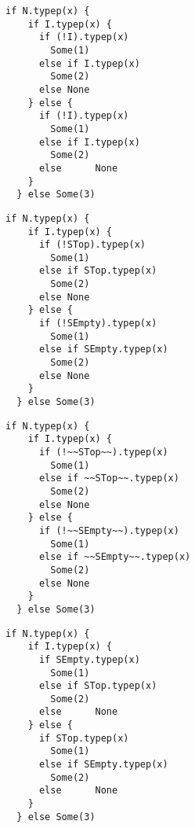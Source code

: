 \newsavebox\typecaseGbox
\begin{lrbox}{\typecaseGbox}
  \begin{minipage}{8cm}
\begin{lstlisting}[style=scalaioScala]
  if N.typep(x) {
    if I.typep(x) {
      if (!I).typep(x)
        Some(1)
      else if I.typep(x)
        Some(2)
      else None
    } else {
      if (!I).typep(x)
        Some(1)
      else if I.typep(x)
        Some(2)
      else      None
    }
  } else Some(3)
\end{lstlisting}
  \end{minipage}
\end{lrbox}


\newsavebox\typecaseHbox
\begin{lrbox}{\typecaseHbox}
  \begin{minipage}{8cm}
\begin{lstlisting}[style=scalaioScala]
  if N.typep(x) {
    if I.typep(x) {
      if (!STop).typep(x)
        Some(1)
      else if STop.typep(x)
        Some(2)
      else None
    } else {
      if (!SEmpty).typep(x)
        Some(1)
      else if SEmpty.typep(x)
        Some(2)
      else None
    }
  } else Some(3)
\end{lstlisting}
  \end{minipage}
\end{lrbox}

\newsavebox\typecaseHhbox
\begin{lrbox}{\typecaseHhbox}
  \begin{minipage}{8cm}
\begin{lstlisting}[style=scalaioScala]
  if N.typep(x) {
    if I.typep(x) {
      if (!~~STop~~).typep(x)
        Some(1)
      else if ~~STop~~.typep(x)
        Some(2)
      else None
    } else {
      if (!~~SEmpty~~).typep(x)
        Some(1)
      else if ~~SEmpty~~.typep(x)
        Some(2)
      else None
    }
  } else Some(3)
\end{lstlisting}
  \end{minipage}
\end{lrbox}

\newsavebox\typecaseIbox
\begin{lrbox}{\typecaseIbox}
  \begin{minipage}{8cm}
\begin{lstlisting}[style=scalaioScala]
  if N.typep(x) {
    if I.typep(x) {
      if SEmpty.typep(x)
        Some(1)
      else if STop.typep(x)
        Some(2)
      else      None
    } else {
      if STop.typep(x)
        Some(1)
      else if SEmpty.typep(x)
        Some(2)
      else      None
    }
  } else Some(3)
\end{lstlisting}
  \end{minipage}
\end{lrbox}

